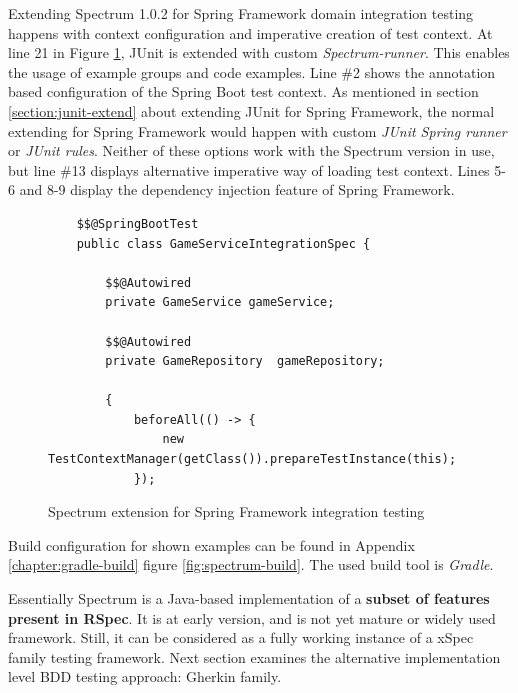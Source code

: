     Extending Spectrum 1.0.2 for Spring Framework domain integration testing happens with context configuration and imperative
    creation of test context. At line 21 in Figure \ref{fig:spectrum-init}, JUnit is extended with custom \textit{Spectrum-runner}.
    This enables the usage of example groups and code examples. Line \#2 shows the annotation based configuration of the Spring Boot
    test context. As mentioned in section \ref{section:junit-extend} about extending JUnit for Spring Framework,
    the normal extending for Spring Framework would
    happen with custom \textit{JUnit Spring runner} or \textit{JUnit rules}. Neither of these options work with the Spectrum version in use,
    but line \#13 displays alternative imperative way of loading test context. Lines 5-6 and 8-9 display the dependency
    injection feature of Spring Framework.

    \begin{figure}[H]
    \begin{lstlisting}[style=java]
    %%@RunWith%%(Spectrum.class)
    $$@SpringBootTest
    public class GameServiceIntegrationSpec {

        $$@Autowired
        private GameService gameService;

        $$@Autowired
        private GameRepository  gameRepository;

        {
            beforeAll(() -> {
                new TestContextManager(getClass()).prepareTestInstance(this);
            });
    \end{lstlisting}
        \caption{Spectrum extension for Spring Framework integration testing}
        \label{fig:spectrum-init}
    \end{figure}

    Build configuration for shown examples can be found in Appendix \ref{chapter:gradle-build} figure \ref{fig:spectrum-build}.
    The used build tool is \textit{Gradle}.

    Essentially Spectrum is a Java-based implementation of a \textbf{subset of features present in RSpec}. It is at early version,
    and is not yet mature or widely used framework. Still, it can be considered as a fully working instance of a xSpec family
    testing framework. Next section examines the alternative implementation level BDD testing approach: Gherkin family.


